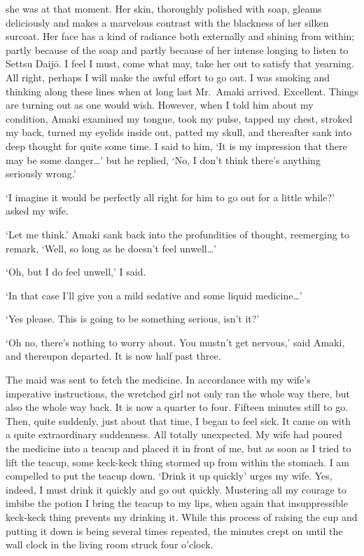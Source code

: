 \documentclass[12pt, openright]{book}
\begin{document}
she was at that moment. Her skin, thoroughly polished with soap, gleams
deliciously and makes a marvelous contrast with the blackness of her
silken surcoat. Her face has a kind of radiance both externally and
shining from within; partly because of the soap and partly because of
her intense longing to listen to Settsu Daijō. I feel I must, come what
may, take her out to satisfy that yearning. All right, perhaps I will
make the awful effort to go out. I was smoking and thinking along these
lines when at long last Mr.~Amaki arrived. Excellent. Things are turning
out as one would wish. However, when I told him about my condition,
Amaki examined my tongue, took my pulse, tapped my chest, stroked my
back, turned my eyelids inside out, patted my skull, and thereafter sank
into deep thought for quite some time. I said to him, `It is my
impression that there may be some danger\ldots{}' but he replied, `No, I
don't think there's anything seriously wrong.'

`I imagine it would be perfectly all right for him to go out for a
little while?' asked my wife.

`Let me think.' Amaki sank back into the profundities of thought,
reemerging to remark, `Well, so long as he doesn't feel unwell\ldots{}'

`Oh, but I do feel unwell,' I said.

`In that case I'll give you a mild sedative and some liquid
medicine\ldots{}'

`Yes please. This is going to be something serious, isn't it?'

`Oh no, there's nothing to worry about. You mustn't get nervous,' said
Amaki, and thereupon departed. It is now half past three.

The maid was sent to fetch the medicine. In accordance with my wife's
imperative instructions, the wretched girl not only ran the whole way
there, but also the whole way back. It is now a quarter to four. Fifteen
minutes still to go. Then, quite suddenly, just about that time, I began
to feel sick. It came on with a quite extraordinary suddenness. All
totally unexpected. My wife had poured the medicine into a teacup and
placed it in front of me, but as soon as I tried to lift the teacup,
some keck-keck thing stormed up from within the stomach. I am compelled
to put the teacup down. `Drink it up quickly' urges my wife. Yes,
indeed, I must drink it quickly and go out quickly. Mustering all my
courage to imbibe the potion I bring the teacup to my lips, when again
that insuppressible keck-keck thing prevents my drinking it. While this
process of raising the cup and putting it down is being several times
repeated, the minutes crept on until the wall clock in the living room
struck four o'clock.
\end{document}
